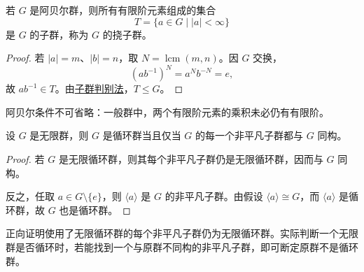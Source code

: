 \begin{proposition}\label{prop:torsion-subgroup}
若 $G$ 是阿贝尔群，则所有有限阶元素组成的集合
\[
  T=\{a\in G\mid |a|<\infty\}
\]
是 $G$ 的子群，称为 $G$ 的挠子群。
\end{proposition}

\begin{proof}
若 $|a|=m$、$|b|=n$，取 $N=\operatorname{lcm}(m,n)$。因 $G$ 交换，
\[
  (ab^{-1})^N=a^N b^{-N}=e,
\]
故 $ab^{-1}\in T$。由\hyperref[thm:subgroup-test]{子群判别法}，$T\leq G$。
\end{proof}

\begin{purplenote}
阿贝尔条件不可省略：一般群中，两个有限阶元素的乘积未必仍有有限阶。
\end{purplenote}

\begin{proposition}\label{prop:infinite-cyclic-subgroups}
设 $G$ 是无限群，则 $G$ 是循环群当且仅当 $G$ 的每一个非平凡子群都与 $G$ 同构。
\end{proposition}

\begin{proof}
若 $G$ 是无限循环群，则其每个非平凡子群仍是无限循环群，因而与 $G$ 同构。

反之，任取 $a\in G\setminus\{e\}$，则 $\langle a\rangle$ 是 $G$ 的非平凡子群。由假设 $\langle a\rangle\cong G$，而 $\langle a\rangle$ 是循环群，故 $G$ 也是循环群。
\end{proof}

\begin{purplenote}
正向证明使用了无限循环群的每个非平凡子群仍为无限循环群。实际判断一个无限群是否循环时，若能找到一个与原群不同构的非平凡子群，即可断定原群不是循环群。
\end{purplenote}
